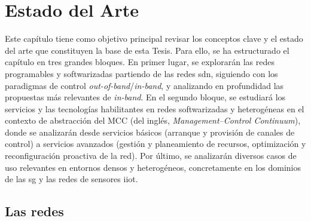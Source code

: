 \chapter{Estado del Arte}
\label{ch:sota}

Este capítulo tiene como objetivo principal revisar los conceptos clave y el estado del arte que constituyen la base de esta Tesis. Para ello, se ha estructurado el capítulo en tres grandes bloques. En primer lugar, se explorarán las redes programables y softwarizadas partiendo de las redes \gls{sdn}, siguiendo con los paradigmas de control \textit{out-of-band}/\textit{in-band}, y analizando en profundidad las propuestas más relevantes de \textit{in-band}. En el segundo bloque, se estudiará los servicios y las tecnologías habilitantes en redes softwarizadas y heterogéneas en el contexto de abstracción del MCC (del inglés, \textit{Management–Control Continuum}), donde se analizarán desde servicios básicos (arranque y provisión de canales de control) a servicios avanzados (gestión y planeamiento de recursos, optimización y reconfiguración proactiva de la red). Por último, se analizarán diversos casos de uso relevantes en entornos densos y heterogéneos, concretamente en los dominios de las \gls{sg} y las redes de sensores \gls{iiot}. 

\section{Las redes }
\label{sec:redes_sdn} 

